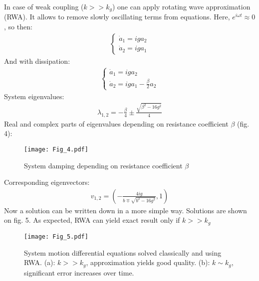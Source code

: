 \documentclass[]{article}
\begin{document}
In case of weak coupling ($k>>k_g$) one can apply rotating wave approximation (RWA). It allows to remove slowly oscillating terms from equations. Here, $e^{i\omega t} \approx 0$, so then:
\begin{align*}
	\begin{cases}
		\dot a_1 = iga_2
		\\
		\dot a_2 = iga_1
	\end{cases}
\end{align*}
And with dissipation:
\begin{align*}
	\begin{cases}
		\dot a_1 = iga_2
		\\
		\dot a_2 = iga_1 - \frac{\beta}{2}a_2 
	\end{cases}
\end{align*}
System eigenvalues:
\begin{align*}
	\lambda_{1,2} = -\frac{\beta}{4} \pm \frac{\sqrt{\beta^2-16g^2}}{4}
\end{align*}
Real and complex parts of eigenvalues depending on resistance coefficient $\beta$ (fig. 4):
\begin{figure}[h]
	\centering
	\texttt{[image: Fig\_4.pdf]}
	\caption{System damping depending on resistance coefficient $\beta$}
\end{figure}\newline
Corresponding eigenvectors:
\begin{align*}
		v_{1,2} = \left(-\frac{4ig}{b \mp \sqrt{b^2-16g^2}}, 1	\right)
\end{align*}
Now a solution can be written down in a more simple way. Solutions are shown on fig. 5. As expected, RWA can yield exact result only if $k>>k_g$
\begin{figure}[h]
	\centering
	\texttt{[image: Fig\_5.pdf]}
	\caption{System motion differential equations solved classically and using RWA. (a): {$k>>k_g$}, approximation yields good quality. (b): {$k \sim k_g$}, significant error increases over time.}
\end{figure}
\end{document}
